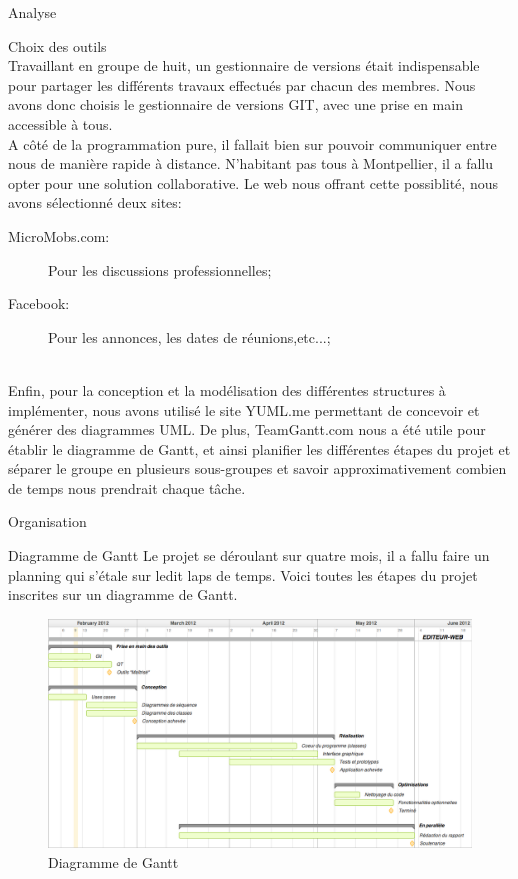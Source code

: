 \documentclass[a4paper, 12pt]{report}
\begin{document}
\begin{part}{Analyse}
\begin{chapter}{Choix des outils}
			\\
			Travaillant en groupe de huit, un gestionnaire de versions était indispensable pour partager les différents travaux effectués
			par chacun des membres. Nous avons donc choisis le gestionnaire de versions GIT, avec une prise en main accessible à tous.
			\\
			A côté de la programmation pure, il fallait bien sur pouvoir communiquer entre nous de manière rapide à distance. 
			N'habitant pas tous à Montpellier, il a fallu opter pour une solution collaborative. 
			Le web nous offrant cette possiblité, nous avons sélectionné deux sites:
			\begin{description}
				\item[MicroMobs.com:] Pour les discussions professionnelles;
				\item[Facebook:] Pour les annonces, les dates de réunions,etc...;
			\end{description}~\\
			Enfin, pour la conception et la modélisation des différentes structures à implémenter, nous avons utilisé le site YUML.me
			permettant de concevoir et générer des diagrammes UML. %
			De plus, TeamGantt.com nous a été utile pour établir le diagramme de Gantt, et ainsi planifier les différentes 
			étapes du projet et séparer le groupe en plusieurs sous-groupes et savoir approximativement combien de temps nous prendrait chaque tâche.
			\\

		\end{chapter}
		\begin{chapter}{Organisation}
		\begin{section}{Diagramme de Gantt}
			Le projet se déroulant sur quatre mois, il a fallu faire un planning qui s'étale sur ledit laps de temps.
			Voici toutes les étapes du projet inscrites sur un diagramme de Gantt.
				\begin{figure}[h]
					\begin{center}
						\includegraphics[width=17cm]{DiagrammeGantt.png}
						\caption{Diagramme de Gantt}
					\end{center}
				\end{figure}~\\
			\end{section}
		\end{chapter}
	\end{part}
\end{document}

